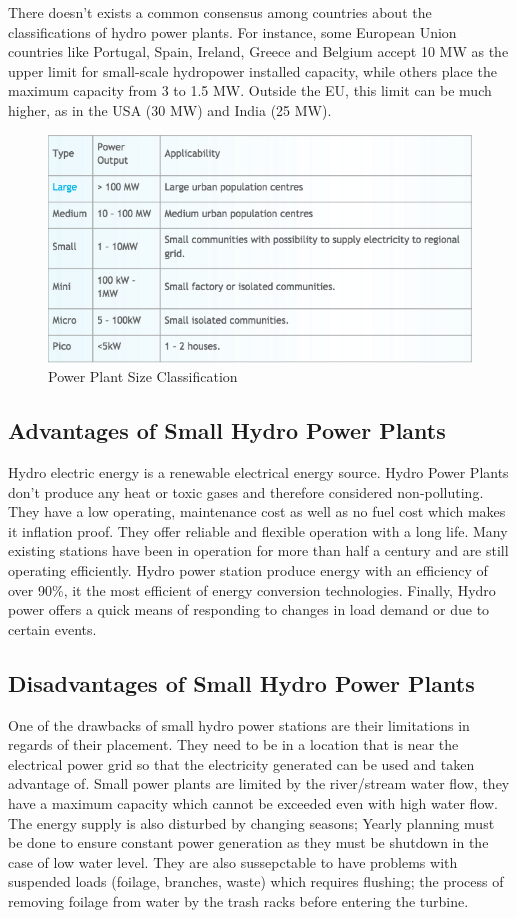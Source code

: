 There doesn't exists a common consensus among countries about the classifications of hydro power plants. For instance, some European Union countries like Portugal, Spain, Ireland, Greece and Belgium accept 10 MW as the upper limit for small-scale hydropower installed capacity, while others place the maximum capacity from 3 to 1.5 MW. Outside the EU, this limit can be much higher, as in the USA (30 MW) and India (25 MW).\cite{HydroPP}
\begin{figure}[H]
\centering
\includegraphics[scale=0.7]{Images/PP_Classification.png}
\caption[Power Plant Size Classification]{Power Plant Size Classification \cite{HydroPower}}
\end{figure} 
\subsection{Advantages of Small Hydro Power Plants}
Hydro electric energy is a renewable electrical energy source. Hydro Power Plants don't produce any heat or toxic gases and therefore considered non-polluting. They have a low operating, maintenance cost as well as no fuel cost which makes it inflation proof. They offer reliable and flexible operation with a long life. Many existing stations have been in operation for more than half a century and are still operating efficiently. Hydro power station produce energy with an efficiency of over 90\%, it the most efficient of energy conversion technologies. Finally, Hydro power offers a quick means of responding to changes in load demand or due to certain events.\cite{SmallScale}
\subsection{Disadvantages of Small Hydro Power Plants}
One of the drawbacks of small hydro power stations are their limitations in regards of their placement. They need to be in a location that is near the electrical power grid so that the electricity generated can be used and taken advantage of. Small power plants are limited by the river/stream water flow, they have a maximum capacity which cannot be exceeded even with high water flow. The energy supply is also disturbed by changing seasons; Yearly planning must be done to ensure constant power generation as they must be shutdown in the case of low water level.\cite{HydroPP,SEIT2017} They are also sussepctable to have problems with suspended loads (foilage, branches, waste) which requires flushing; the process of removing foilage from water by the trash racks before entering the turbine.\cite{SEIT2017}
